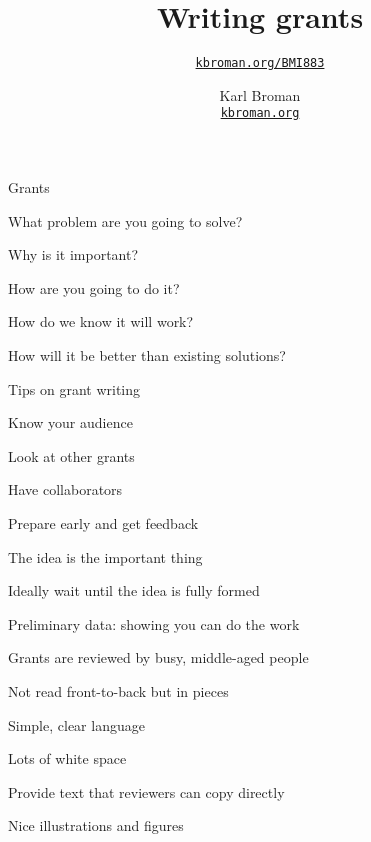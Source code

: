 \documentclass[aspectratio=169,12pt,t]{beamer}
\title{Writing grants}
\subtitle{}
\author{\href{https://kbroman.org/BMI883}{\tt kbroman.org/BMI883} }
\institute{}
\date{\small \hspace{3in} Karl Broman \\
  \hspace{3in} \href{https://kbroman.org}{\color{foreground}
    \small \tt kbroman.org}}
\begin{document}
\begin{frame}{Grants}

  \bi
\item What problem are you going to solve?
\item Why is it important?
\item How are you going to do it?
\item How do we know it will work?
\item How will it be better than existing solutions?
  \ei

\end{frame}




\begin{frame}{Tips on grant writing}

\bi
\item Know your audience
\item Look at other grants
\item Have collaborators
\item Prepare early and get feedback
\item The idea is the important thing
  \bi
  \item Ideally wait until the idea is fully formed
  \ei
\item Preliminary data: showing you can do the work
\item Grants are reviewed by busy, middle-aged people
  \bi
  \item Not read front-to-back but in pieces
  \ei
\item Simple, clear language
\item Lots of white space
\item Provide text that reviewers can copy directly
\item Nice illustrations and figures
\ei

\end{frame}
\end{document}
